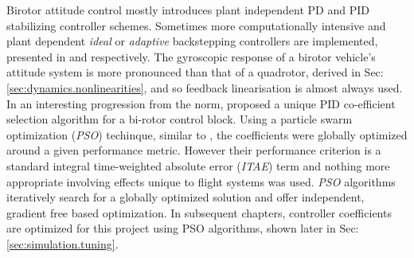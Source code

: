 Birotor attitude control mostly introduces plant independent PD \cite{obliquepitch} and PID \cite{tiltrotorUAV} stabilizing controller schemes. Sometimes more computationally intensive and plant dependent \emph{ideal} or \emph{adaptive} backstepping controllers are implemented, presented in \cite{smalltwotilting,tpheonix} and \cite{adaptivebackstep} respectively. The gyroscopic response of a birotor vehicle's attitude system is more pronounced than that of a quadrotor, derived in Sec:\ref{sec:dynamics.nonlinearities}, and so feedback linearisation is almost always used. In an interesting progression from the norm, \cite{autopilotPSO} proposed a unique PID co-efficient selection algorithm for a bi-rotor control block. Using a particle swarm optimization (\emph{PSO}) techinque, similar to \cite{adaptivepso}, the coefficients were globally optimized around a given performance metric. However their performance criterion is a standard integral time-weighted absolute error (\emph{ITAE}) term and nothing more appropriate involving effects unique to flight systems was used. \emph{PSO} algorithms iteratively search for a globally optimized solution and offer independent, gradient free based optimization. In subsequent chapters, controller coefficients are optimized for this project using PSO algorithms, shown later in Sec:\ref{sec:simulation.tuning}.
\par
